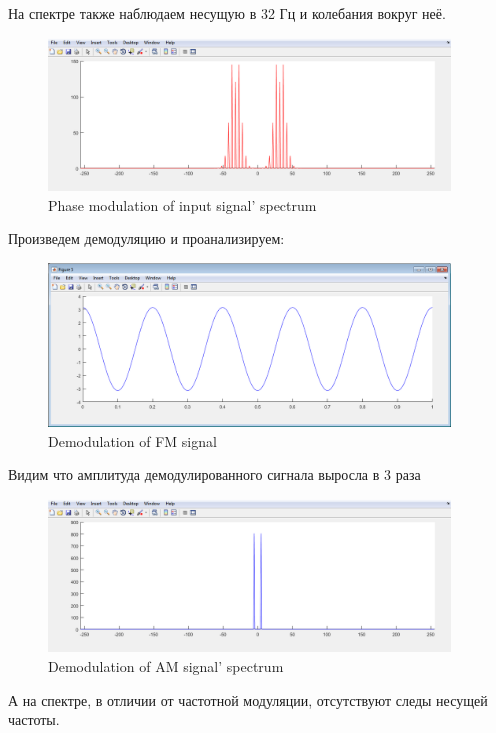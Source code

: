 \documentclass[a4paper,14pt]{extarticle}
\begin{document}
На спектре также наблюдаем несущую в 32 Гц и колебания вокруг неё.
\begin{figure}[H]
\centering
\includegraphics[width=0.95\textwidth]{pm_sp}
\captionsetup{justification=centering,margin=1.0 cm}
\caption{Phase modulation of input signal' spectrum}
\label{any}
\end{figure}

Произведем демодуляцию и проанализируем:

\begin{figure}[H]
\centering
\includegraphics[width=0.95\textwidth]{pm_dm}
\captionsetup{justification=centering,margin=1.0cm}
\caption{Demodulation of FM signal}
\label{sig}
\end{figure}
Видим что амплитуда демодулированного сигнала выросла в 3 раза

\begin{figure}[H]
\centering
\includegraphics[width=0.95\textwidth]{pm_dm_sp}
\captionsetup{justification=centering,margin=1.0 cm}
\caption{Demodulation of AM signal' spectrum}
\label{any}
\end{figure}
А на спектре, в отличии от частотной модуляции, отсутствуют следы несущей частоты.
\end{document}
